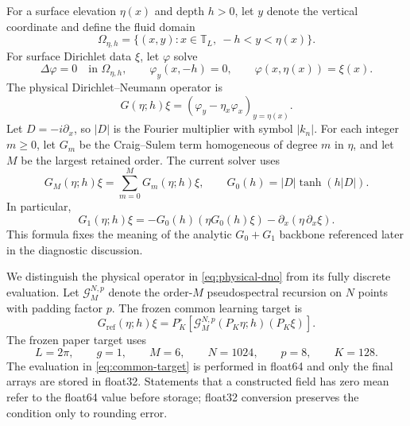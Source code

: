 \documentclass[11pt]{article}
\newcommand{\T}{\mathbb T}
\newcommand{\G}{\mathcal G}
\begin{document}
For a surface elevation $\eta(x)$ and depth $h>0$, let $y$ denote the vertical
coordinate and define the fluid domain
\begin{equation}
  \Omega_{\eta,h}
  =\{(x,y):x\in\T_L,\ -h<y<\eta(x)\}.
\end{equation}
For surface Dirichlet data $\xi$, let $\varphi$ solve
\begin{equation}
  \Delta\varphi=0\quad\text{in }\Omega_{\eta,h},\qquad
  \varphi_y(x,-h)=0,\qquad
  \varphi(x,\eta(x))=\xi(x).
\end{equation}
The physical Dirichlet--Neumann operator is
\begin{equation}
  G(\eta;h)\xi
  =\left(\varphi_y-\eta_x\varphi_x\right)_{y=\eta(x)}.
  \label{eq:physical-dno}
\end{equation}
Let $D=-i\partial_x$, so $|D|$ is the Fourier multiplier with symbol
$|k_n|$.  For each integer $m\geq0$, let $G_m$ be the Craig--Sulem term
homogeneous of degree $m$ in $\eta$, and let $M$ be the largest retained
order.  The current solver uses
\begin{equation}
  G_M(\eta;h)\xi=\sum_{m=0}^{M}G_m(\eta;h)\xi,\qquad
  G_0(h)=|D|\tanh(h|D|).
  \label{eq:cs-truncation}
\end{equation}
In particular,
\begin{equation}
  G_1(\eta;h)\xi
  =-G_0(h)\!\left(\eta G_0(h)\xi\right)
   -\partial_x\!\left(\eta\,\partial_x\xi\right).
  \label{eq:first-cs-term}
\end{equation}
This formula fixes the meaning of the analytic $G_0+G_1$ backbone referenced
later in the diagnostic discussion.

We distinguish the physical operator in \eqref{eq:physical-dno} from its
fully discrete evaluation.  Let $\G^{N,p}_M$ denote the order-$M$
pseudospectral recursion on $N$ points with padding factor $p$.  The frozen
common learning target is
\begin{equation}
  \boxed{
  G_{\mathrm{ref}}(\eta;h)\xi
  =P_K^\circ\!\left[
    \G^{N,p}_M(P_K\eta;h)(P_K\xi)
  \right].}
  \label{eq:common-target}
\end{equation}
The frozen paper target uses
\begin{equation}
  L=2\pi,\qquad g=1,\qquad M=6,\qquad
  N=1024,\qquad p=8,\qquad K=128.
  \label{eq:candidate-discretization}
\end{equation}
The evaluation in \eqref{eq:common-target} is performed in float64 and only
the final arrays are stored in float32.  Statements that a constructed field
has zero mean refer to the float64 value before storage; float32 conversion
preserves the condition only to rounding error.
\end{document}
